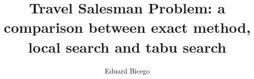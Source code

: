 \documentclass[]{article}
\title{Travel Salesman Problem: a comparison between exact method, local search and tabu search}
\author{Eduard Bicego}
\begin{document}
\maketitle

\begin{abstract}

\end{abstract}




\end{document}
